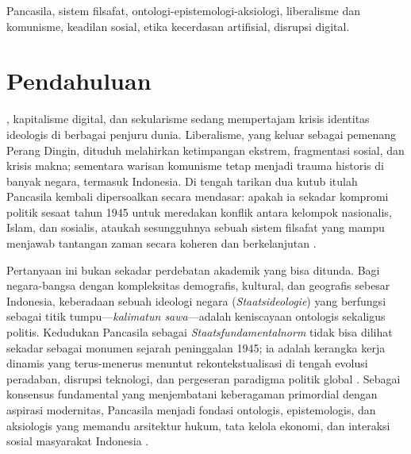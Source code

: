 \documentclass[journal]{IEEEtran}
\begin{document}
\begin{IEEEkeywords}
Pancasila, sistem filsafat, ontologi-epistemologi-aksiologi, liberalisme dan komunisme, keadilan sosial, etika kecerdasan artifisial, disrupsi digital.
\end{IEEEkeywords}


\section{Pendahuluan}

, kapitalisme digital, dan sekularisme sedang mempertajam krisis identitas ideologis di berbagai penjuru dunia. Liberalisme, yang keluar sebagai pemenang Perang Dingin, dituduh melahirkan ketimpangan ekstrem, fragmentasi sosial, dan krisis makna; sementara warisan komunisme tetap menjadi trauma historis di banyak negara, termasuk Indonesia. Di tengah tarikan dua kutub itulah Pancasila kembali dipersoalkan secara mendasar: apakah ia sekadar kompromi politik sesaat tahun 1945 untuk meredakan konflik antara kelompok nasionalis, Islam, dan sosialis, ataukah sesungguhnya sebuah sistem filsafat yang mampu menjawab tantangan zaman secara koheren dan berkelanjutan \cite{latif2018,madung2016,duha2022}.

Pertanyaan ini bukan sekadar perdebatan akademik yang bisa ditunda. Bagi negara-bangsa dengan kompleksitas demografis, kultural, dan geografis sebesar Indonesia, keberadaan sebuah ideologi negara (\textit{Staatsideologie}) yang berfungsi sebagai titik tumpu---\textit{kalimatun sawa}---adalah keniscayaan ontologis sekaligus politis. Kedudukan Pancasila sebagai \textit{Staatsfundamentalnorm} tidak bisa dilihat sekadar sebagai monumen sejarah peninggalan 1945; ia adalah kerangka kerja dinamis yang terus-menerus menuntut rekontekstualisasi di tengah evolusi peradaban, disrupsi teknologi, dan pergeseran paradigma politik global \cite{assiddiqie2006,mahfud2009,aswandi2019}. Sebagai konsensus fundamental yang menjembatani keberagaman primordial dengan aspirasi modernitas, Pancasila menjadi fondasi ontologis, epistemologis, dan aksiologis yang memandu arsitektur hukum, tata kelola ekonomi, dan interaksi sosial masyarakat Indonesia \cite{pristiwiyanto2021,rahmatullah2022}.
\end{document}

